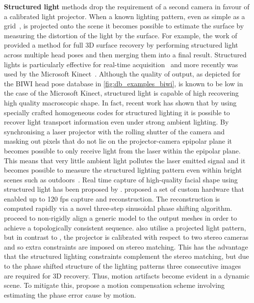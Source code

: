 \textbf{Structured light} methods drop the requirement of a second camera in
favour of a calibrated light projector. When a known lighting pattern, even as
simple as a grid~\cite{will1971grid}, is projected onto the scene it becomes
possible to estimate the surface by measuring the distortion of the light by the
surface. For example, the work of \citet{garcia2001low} provided a method
for full 3D surface recovery by performing structured light across multiple
head poses and then merging them into a final result.
Structured lights is particularly effective for real-time
acquisition~\cite{rusinkiewicz2002real} and more recently was used by the
Microsoft Kinect~\cite{zhang2012microsoft}. Although the quality of output, as
depicted for the BIWI head pose database in
\cref{fig:db_examples_biwi}, is known to be low in the case of the Microsoft
Kinect, structured light is capable of high recovering high quality macroscopic
shape. In fact, recent work has shown that by using specially crafted
homogeneous codes for structured lighting it is possible to recover light
transport information even under strong ambient lighting.
By synchronising a laser projector with the rolling shutter of the camera and
masking out pixels that do not lie on the projector-camera epipolar plane it
becomes possible to only receive light from the laser within the epipolar plane.
This means that very little ambient light pollutes the laser emitted
signal and it becomes possible to measure the structured lighting pattern
even within bright scenes such as outdoors~\cite{o2015homogeneous}.
Real time capture of high-quality facial shape using
structured light has been proposed by \citet{zhang2006high,weise2007fast}.
\citet{zhang2006high,wang2004high} proposed a set of custom hardware that
enabled up to 120 fps capture and reconstruction. The reconstruction is computed
rapidly via a novel three-step sinusoidal phase shifting algorithm.
\citet{zhang2006high} proceed to non-rigidly align a generic model to the output
meshes in order to achieve a topologically consistent sequence.
\citet{weise2007fast} also utilise a projected light pattern, but in contrast to
\citet{zhang2006high}, the projector is calibrated with respect to two stereo
cameras and so extra constraints are imposed on stereo matching. This has the
advantage that the structured lighting constraints complement the stereo
matching, but due to the phase shifted structure of the lighting patterns three
consecutive images are required for 3D recovery. Thus, motion artifacts become
evident in a dynamic scene. To mitigate this, \citet{weise2007fast} propose a
motion compensation scheme involving estimating the phase error cause by motion.

